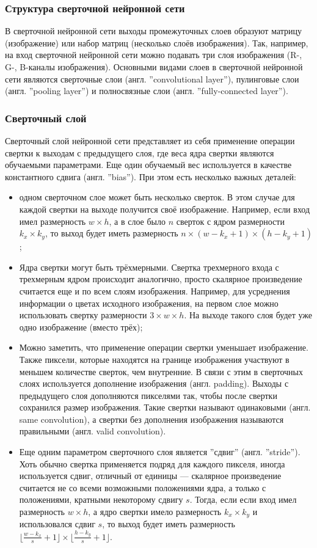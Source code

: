 \documentclass[12pt, a4paper, titlepage]{extreport}
\begin{document}
	\subsubsection*{Структура сверточной нейронной сети}
	В сверточной нейронной сети выходы промежуточных слоев образуют матрицу (изображение) или набор матриц (несколько слоёв изображения). Так, например, на вход сверточной нейронной сети можно подавать три слоя изображения (R-, G-, B-каналы изображения). Основными видами слоев в сверточной нейронной сети являются сверточные слои (англ. ''convolutional layer''), пулинговые слои (англ. ''pooling layer'') и полносвязные слои (англ. ''fully-connected layer'').
	\subsubsection*{Сверточный слой}
	Сверточный слой нейронной сети представляет из себя применение операции свертки к выходам с предыдущего слоя, где веса ядра свертки являются обучаемыми параметрами. Еще один обучаемый вес используется в качестве константного сдвига (англ. ''bias''). При этом есть несколько важных деталей:
	\begin{itemize}
		\item  одном сверточном слое может быть несколько сверток. В этом случае для каждой свертки на выходе получится своё изображение. Например, если вход имел размерность $w\times h$, а в слое было $n$ сверток с ядром размерности $k_x\times k_y$, то выход будет иметь размерность $n\times(w - k_x + 1)\times(h - k_y + 1)$;
		\item Ядра свертки могут быть трёхмерными. Свертка трехмерного входа с трехмерным ядром происходит аналогично, просто скалярное произведение считается еще и по всем слоям изображения. Например, для усреднения информации о цветах исходного изображения, на первом слое можно использовать свертку размерности $3\times w \times h$. На выходе такого слоя будет уже одно изображение (вместо трёх);
		\item Можно заметить, что применение операции свертки уменьшает изображение. Также пиксели, которые находятся на границе изображения участвуют в меньшем количестве сверток, чем внутренние. В связи с этим в сверточных слоях используется дополнение изображения (англ. padding). Выходы с предыдущего слоя дополняются пикселями так, чтобы после свертки сохранился размер изображения. Такие свертки называют одинаковыми (англ. same convolution), а свертки без дополнения изображения называются правильными (англ. valid convolution).
		\item Еще одним параметром сверточного слоя является ''сдвиг'' (англ. ''stride''). Хоть обычно свертка применяется подряд для каждого пикселя, иногда используется сдвиг, отличный от единицы {{---}} скалярное произведение считается не со всеми возможными положениями ядра, а только с положениями, кратными некоторому сдвигу $s$. Тогда, если если вход имел размерность $w\times h$, а ядро свертки имело размерность $k_x\times k_y$ и использовался сдвиг $s$, то выход будет иметь размерность $\lfloor\frac{w - k_x}{s} + 1\rfloor\times\lfloor\frac{h - k_y}{s} + 1\rfloor$.
	\end{itemize}
\end{document}
